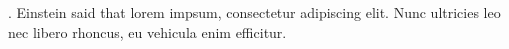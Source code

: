 \documentclass{article}
\begin{document}
\cite{Einstein1920}
\cite{Darwin1888}.
Einstein said \cite{Einstein1920} that lorem impsum, consectetur adipiscing elit.
Nunc ultricies leo nec libero rhoncus, eu vehicula enim efficitur. \cite{Darwin1888}




\end{document}
